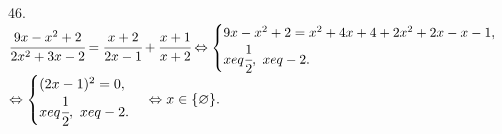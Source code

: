 46. $\cfrac{9x-x^2+2}{2x^2+3x-2}=\cfrac{x+2}{2x-1}+\cfrac{x+1}{x+2}\Leftrightarrow\begin{cases} 9x-x^2+2=x^2+4x+4+2x^2+2x-x-1,\\ x
eq\cfrac{1}{2},\ x
eq-2.\end{cases}$\\$\Leftrightarrow\begin{cases} (2x-1)^2=0,\\ x
eq\cfrac{1}{2},\ x
eq-2.\end{cases}\Leftrightarrow x\in\{\varnothing\}.$\\
